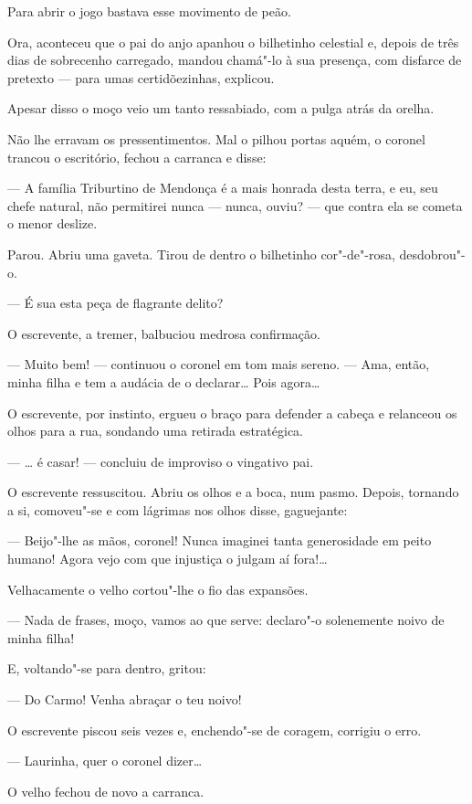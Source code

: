 Para abrir o jogo bastava esse movimento de peão.

Ora, aconteceu que o pai do anjo apanhou o bilhetinho celestial e,
depois de três dias de sobrecenho carregado, mandou chamá"-lo à sua
presença, com disfarce de pretexto --- para umas certidõezinhas,
explicou.

Apesar disso o moço veio um tanto ressabiado, com a pulga atrás da
orelha.

Não lhe erravam os pressentimentos. Mal o pilhou portas aquém, o coronel
trancou o escritório, fechou a carranca e disse:

--- A família Triburtino de Mendonça é a mais honrada desta terra, e eu,
seu chefe natural, não permitirei nunca --- nunca, ouviu? --- que contra
ela se cometa o menor deslize.

Parou. Abriu uma gaveta. Tirou de dentro o bilhetinho cor"-de"-rosa,
desdobrou"-o.

--- É sua esta peça de flagrante delito?

O escrevente, a tremer, balbuciou medrosa confirmação.

--- Muito bem! --- continuou o coronel em tom mais sereno. --- Ama,
então, minha filha e tem a audácia de o declarar\ldots{} Pois agora\ldots{}

O escrevente, por instinto, ergueu o braço para defender a cabeça e
relanceou os olhos para a rua, sondando uma retirada estratégica.

--- \ldots{} é casar! --- concluiu de improviso o vingativo pai.

O escrevente ressuscitou. Abriu os olhos e a boca, num pasmo. Depois,
tornando a si, comoveu"-se e com lágrimas nos olhos disse, gaguejante:

--- Beijo"-lhe as mãos, coronel! Nunca imaginei tanta generosidade em
peito humano! Agora vejo com que injustiça o julgam aí fora!\ldots{}

Velhacamente o velho cortou"-lhe o fio das expansões.

--- Nada de frases, moço, vamos ao que serve: declaro"-o solenemente
noivo de minha filha!

E, voltando"-se para dentro, gritou:

--- Do Carmo! Venha abraçar o teu noivo!

O escrevente piscou seis vezes e, enchendo"-se de coragem, corrigiu o
erro.

--- Laurinha, quer o coronel dizer\ldots{}

O velho fechou de novo a carranca.

